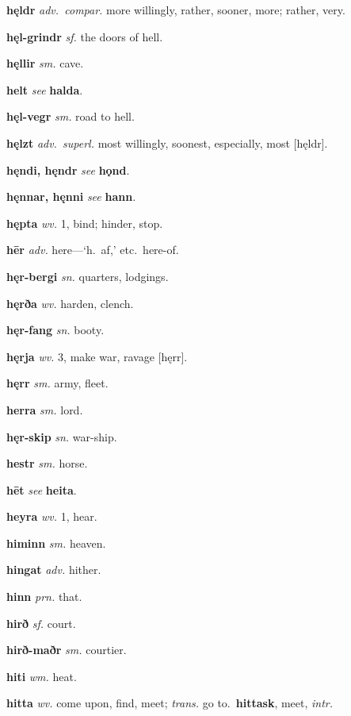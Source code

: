 \documentclass[12pt,letterpaper]{book}
\begin{document}
\noindent
\textbf{hęldr} \textit{adv.\ compar.} more willingly, rather, sooner,
	more; rather, very.

\noindent
\textbf{hęl-grindr} \textit{sf.} the doors of hell.

\noindent
\textbf{hęllir} \textit{sm.} cave.

\noindent
\textbf{helt} \textit{} \textit{see} \textbf{halda}.

\noindent
\textbf{hęl-vegr} \textit{sm.} road to hell.

\noindent
\textbf{hęlzt} \textit{adv.\ superl.} most willingly, soonest, especially,
	most [hęldr].

\noindent
\textbf{hęndi, hęndr} \textit{} \textit{see} \textbf{hǫnd}.

\noindent
\textbf{hęnnar, hęnni} \textit{} \textit{see} \textbf{hann}.

\noindent
\textbf{hępta} \textit{wv.} 1, bind; hinder, stop.

\noindent
\textbf{hēr} \textit{adv.} here---`h.\ af,' etc.\ here-of.

\noindent
\textbf{hęr-bergi} \textit{sn.} quarters, lodgings.

\noindent
\textbf{hęrða} \textit{wv.} harden, clench.

\noindent
\textbf{hęr-fang} \textit{sn.} booty.

\noindent
\textbf{hęrja} \textit{wv.} 3, make war, ravage [hęrr].

\noindent
\textbf{hęrr} \textit{sm.} army, fleet.

\noindent
\textbf{herra} \textit{sm.} lord.

\noindent
\textbf{hęr-skip} \textit{sn.} war-ship.

\noindent
\textbf{hestr} \textit{sm.} horse.

\noindent
\textbf{hēt} \textit{} \textit{see} \textbf{heita}.

\noindent
\textbf{heyra} \textit{wv.} 1, hear.

\noindent
\textbf{himinn} \textit{sm.} heaven.

\noindent
\textbf{hingat} \textit{adv.} hither.

\noindent
\textbf{hinn} \textit{prn.} that.

\noindent
\textbf{hirð} \textit{sf.} court.

\noindent
\textbf{hirð-maðr} \textit{sm.} courtier.

\noindent
\textbf{hiti} \textit{wm.} heat.

\noindent
\textbf{hitta} \textit{wv.} come upon, find, meet; \textit{trans.} go
	to.\  \textbf{hittask}, meet, \textit{intr.}
\end{document}
